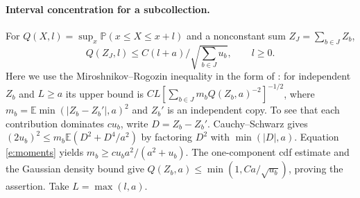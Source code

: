 \documentclass[11pt]{article}
\newcommand{\E}{\mathbb E}
\newcommand{\Prb}{\mathbb P}
\numberwithin{equation}{section}
\begin{document}
\paragraph{Interval concentration for a subcollection.}
For $Q(X,l)=\sup_x\Prb(x\le X\le x+l)$ and a nonconstant sum $Z_J=\sum_{b\in J}Z_b$,
\begin{equation}\label{e:concentration}
 Q(Z_J,l)\le C(l+a)/\sqrt{\sum_{b\in J}u_b},\qquad l\ge0.
\end{equation}
Here we use the Miroshnikov--Rogozin inequality \cite{MR} in the form of
\cite[(1.2)--(1.3)]{BC}: for independent $Z_b$ and $L\ge a$ its upper bound is
$CL[\sum_{b\in J}m_b Q(Z_b,a)^{-2}]^{-1/2}$, where
$m_b=\E\min(|Z_b-Z_b'|,a)^2$ and $Z_b'$ is an independent copy.
To see that each contribution dominates $c u_b$, write $D=Z_b-Z_b'$.
Cauchy--Schwarz gives
$(2u_b)^2\le m_b\E(D^2+D^4/a^2)$ by factoring $D^2$ with $\min(|D|,a)$.
Equation \eqref{e:moments} yields $m_b\ge c u_b a^2/(a^2+u_b)$.
The one-component cdf estimate and the Gaussian density bound give
$Q(Z_b,a)\le\min(1,Ca/\sqrt{u_b})$, proving the assertion. Take $L=\max(l,a)$.
\end{document}
